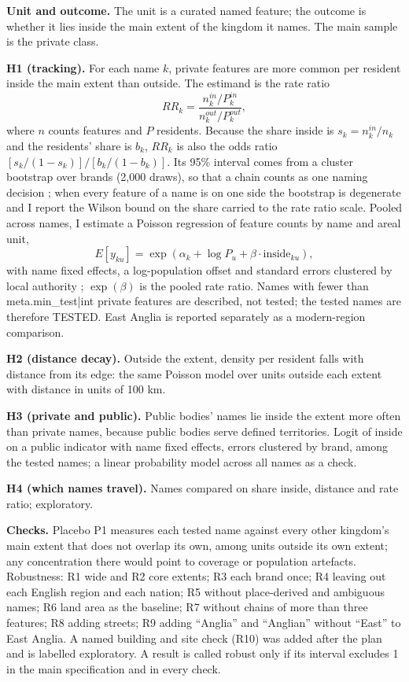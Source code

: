 \documentclass[11pt,a4paper]{article}
\begin{document}
\textbf{Unit and outcome.} The unit is a curated named feature; the outcome is whether it lies inside the main extent of the kingdom it names. The main sample is the private class.

\textbf{H1 (tracking).} For each name $k$, private features are more common per resident inside the main extent than outside. The estimand is the rate ratio
\[ RR_k = \frac{n^{in}_k / P^{in}_k}{n^{out}_k / P^{out}_k}, \]
where $n$ counts features and $P$ residents. Because the share inside is $s_k = n^{in}_k/n_k$ and the residents' share is $b_k$, $RR_k$ is also the odds ratio $[s_k/(1-s_k)]/[b_k/(1-b_k)]$. Its 95\% interval comes from a cluster bootstrap over brands (2,000 draws), so that a chain counts as one naming decision \citep{efron1993,cameron2008}; when every feature of a name is on one side the bootstrap is degenerate and I report the Wilson bound on the share carried to the rate ratio scale. Pooled across names, I estimate a Poisson regression of feature counts by name and areal unit,
\[ E[y_{ku}] = \exp(\alpha_k + \log P_u + \beta \cdot \text{inside}_{ku}), \]
with name fixed effects, a log-population offset and standard errors clustered by local authority \citep{santos2006,cameron2015}; $\exp(\beta)$ is the pooled rate ratio. Names with fewer than {{meta.min_test|int}} private features are described, not tested; the tested names are therefore {{TESTED}}. East Anglia is reported separately as a modern-region comparison.

\textbf{H2 (distance decay).} Outside the extent, density per resident falls with distance from its edge: the same Poisson model over units outside each extent with distance in units of 100 km.

\textbf{H3 (private and public).} Public bodies' names lie inside the extent more often than private names, because public bodies serve defined territories. Logit of inside on a public indicator with name fixed effects, errors clustered by brand, among the tested names; a linear probability model across all names as a check.

\textbf{H4 (which names travel).} Names compared on share inside, distance and rate ratio; exploratory.

\textbf{Checks.} Placebo P1 measures each tested name against every other kingdom's main extent that does not overlap its own, among units outside its own extent; any concentration there would point to coverage or population artefacts. Robustness: R1 wide and R2 core extents; R3 each brand once; R4 leaving out each English region and each nation; R5 without place-derived and ambiguous names; R6 land area as the baseline; R7 without chains of more than three features; R8 adding streets; R9 adding ``Anglia'' and ``Anglian'' without ``East'' to East Anglia. A named building and site check (R10) was added after the plan and is labelled exploratory. A result is called robust only if its interval excludes 1 in the main specification and in every check.
\end{document}
